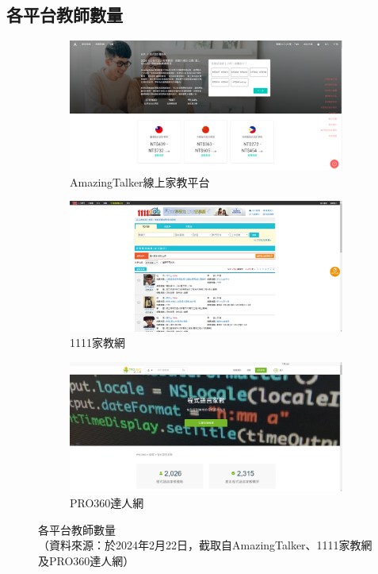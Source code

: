 \subsection{各平台教師數量}
\label{fig:Appendix-Teacher}
\begin{figure}[H]
	\centering
	\begin{subfigure}{0.32\linewidth}
		\centering
		\includegraphics[width=1\textwidth]{images/A-9007.png}
		\caption{AmazingTalker線上家教平台}
		\label{fig:Teacher-1}
	\end{subfigure}
	\begin{subfigure}{0.32\linewidth}
		\centering
		\includegraphics[width=1\textwidth]{images/1111-2482.png}
		\caption{1111家教網}
		\label{fig:Teacher-2}
	\end{subfigure}
	\begin{subfigure}{0.32\linewidth}
		\centering
		\includegraphics[width=1\textwidth]{images/pro360-2026.png}
		\caption{PRO360達人網}
		\label{fig:Teacher-3}
	\end{subfigure}
	\caption[各平台教師數量]{各平台教師數量\\（資料來源：於2024年2月22日，截取自AmazingTalker、1111家教網及PRO360達人網）}
\end{figure}

